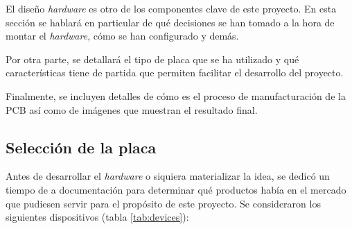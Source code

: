 El diseño \textit{hardware} es otro de los componentes clave de este proyecto. En esta
sección se hablará en particular de qué decisiones se han tomado a la hora de montar
el \textit{hardware}, cómo se han configurado y demás.

Por otra parte, se detallará el tipo de placa que se ha utilizado y qué características
tiene de partida que permiten facilitar el desarrollo del proyecto.

Finalmente, se incluyen detalles de cómo es el proceso de manufacturación de la PCB
así como de imágenes que muestran el resultado final.

\subsection{Selección de la placa}
Antes de desarrollar el \textit{hardware} o siquiera materializar la idea, se dedicó
un tiempo de a documentación para determinar qué productos había en el mercado
que pudiesen servir para el propósito de este proyecto. Se consideraron los
siguientes dispositivos (tabla \ref{tab:devices}):


